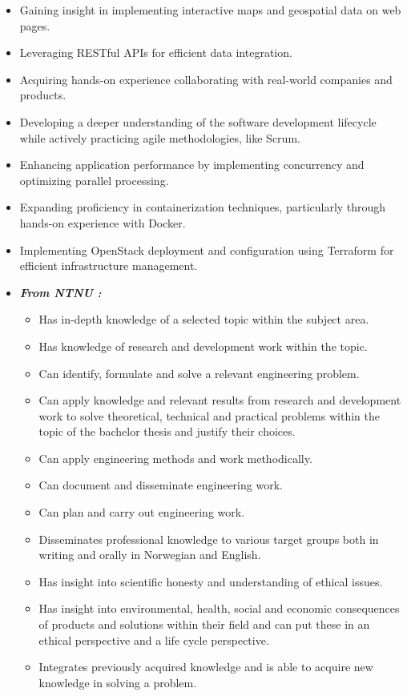 \begin{itemize}
    \item Gaining insight in implementing interactive maps and geospatial data on web pages.
    \item Leveraging RESTful APIs for efficient data integration.
    \item Acquiring hands-on experience collaborating with real-world companies and products.
    \item Developing a deeper understanding of the software development lifecycle while actively practicing agile methodologies, like Scrum.
    \item Enhancing application performance by implementing concurrency and optimizing parallel processing.
    \item Expanding proficiency in containerization techniques, particularly through hands-on experience with Docker.
    \item Implementing OpenStack deployment and configuration using Terraform for efficient infrastructure management.
    \item \textit{\textbf{From NTNU \cite{ntnu_idatg2900}:}}
    \begin{itemize}
        \item Has in-depth knowledge of a selected topic within the subject area.
        \item Has knowledge of research and development work within the topic.
        \item Can identify, formulate and solve a relevant engineering problem.
        \item Can apply knowledge and relevant results from research and development work to solve theoretical, technical and practical problems within the topic of the bachelor thesis and justify their choices.
        \item Can apply engineering methods and work methodically.
        \item Can document and disseminate engineering work.
        \item Can plan and carry out engineering work.
        \item Disseminates professional knowledge to various target groups both in writing and orally in Norwegian and English.
        \item Has insight into scientific honesty and understanding of ethical issues.
        \item Has insight into environmental, health, social and economic consequences of products and solutions within their field and can put these in an ethical perspective and a life cycle perspective.
        \item Integrates previously acquired knowledge and is able to acquire new knowledge in solving a problem.
    \end{itemize}
\end{itemize}

